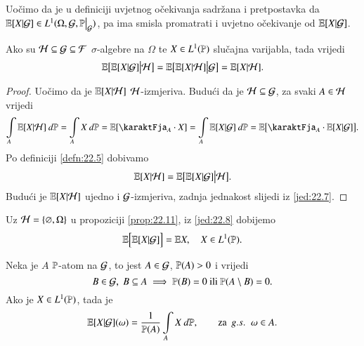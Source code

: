 Uo\v cimo da je u definiciji uvjetnog o\v cekivanja sadr\v zana i pretpostavka da $\masE [X | \famG] \in L^1 (\Omega, \famG, \restr{\masP}{\famG})$, pa ima smisla promatrati i uvjetno o\v cekivanje od $\mathbb{E} [X | \mathcal{G}]$.

\begin{prop}    \label{prop:22.11}
    Ako su $\mathcal{H} \subseteq \mathcal{G} \subseteq \mathcal{F}$ $\sigma$-algebre na $\Omega$ te $X \in L^1 (\mathbb{P})$ slu\v cajna varijabla, tada vrijedi
    \begin{equation*}
        \mathbb{E} \big[ \mathbb{E} [X | \mathcal{G}] \big| \mathcal{H} \big] = \mathbb{E} \big[ \mathbb{E} [X | \mathcal{H}] \big| \mathcal{G} \big] = \mathbb{E} [X | \mathcal{H}].
    \end{equation*}
\end{prop}

\begin{proof}
    Uo\v cimo da je $\mathbb{E} [X | \mathcal{H}]$ $\mathcal{H}$-izmjeriva.
    Budu\' ci da je $\mathcal{H} \subseteq \mathcal{G}$, za svaki $A \in \mathcal{H}$ vrijedi
    \begin{equation*}
        \int\limits_A \masE [X | \famH] \: d \masP = \int\limits_A X \: d \masP = \masE [ \karaktFja_A \cdot X ] = \int\limits_A \masE [X | \famG] \: d \masP = \masE \big[ \karaktFja_A \cdot \masE [X | \famG] \big].
    \end{equation*}
    Po definiciji \ref{defn:22.5} dobivamo
    \begin{equation*}
        \mathbb{E} [X | \mathcal{H}] = \mathbb{E} \big[ \mathbb{E} [X | \mathcal{G}] \big| \mathcal{H} \big].
    \end{equation*}
    Budu\' ci je $\mathbb{E} [X | \mathcal{H}]$ ujedno i $\mathcal{G}$-izmjeriva, zadnja jednakost slijedi iz \eqref{jed:22.7}.
\end{proof}

Uz $\mathcal{H} = \{ \varnothing, \Omega\}$ u propoziciji \ref{prop:22.11}, iz \eqref{jed:22.8} dobijemo
\begin{equation}    \label{jedn:22.12}
    \mathbb{E} \Big[ \mathbb{E} [X | \mathcal{G}] \Big] = \mathbb{E} X, \quad X \in L^1 (\mathbb{P}).
\end{equation}

\begin{zad} \label{zad:22.13}
    Neka je $A$ $\mathbb{P}$-atom na $\mathcal{G}$, to jest $A \in \mathcal{G}$, $\mathbb{P} (A) > 0$ i vrijedi
    \begin{equation*}
        B \in \mathcal{G}, \; B \subseteq A \implies \mathbb{P} (B) = 0 \textnormal{ ili } \mathbb{P} (A \setminus B) = 0.
    \end{equation*}
    Ako je $X \in L^1 (\mathbb{P})$, tada je
    \begin{equation*}
        \mathbb{E} [X | \mathcal{G}] (\omega) = \frac{1}{\mathbb{P} (A)} \int\limits_A X \: d \mathbb{P}, \quad \quad \textnormal{za } \: g.s. \; \; \omega \in A.
    \end{equation*}
\end{zad}


